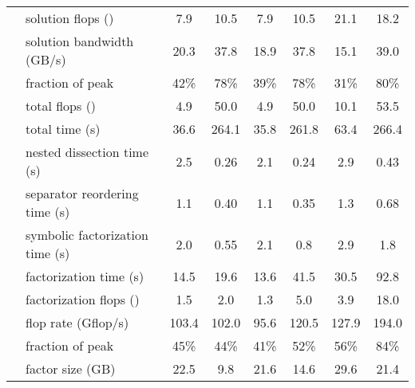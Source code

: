 \documentclass{article}
\begin{document}
\begin{table}[htp!]
\begin{center}
\begin{tabular}{|c|l||c|c|c|c|c|c|}
      &          solution flops () &  7.9    &  10.5  &  7.9  & 10.5  &  21.1  &  18.2  \\ 
      \hhline{|~-||-|-|-|-|-|-|}                                                         
      &                solution bandwidth (GB/s) &  20.3  &  37.8  & 18.9  & 37.8   &  15.1  & 39.0  \\ 
      &   \qquad fraction of peak                & 42\%   & 78\%   & 39\% & 78\%    & 31\%   & 80\% \\
      \hhline{|~-||-|-|-|-|-|-|}                                                               
      &          total flops () &  4.9     & 50.0   & 4.9    &  50.0  & 10.1 & 53.5 \\ 
      \hhline{|~-||-|-|-|-|-|-|}                                                               
      &                         total time (s) &  36.6   & 264.1  &  35.8   & 261.8  & 63.4 & 266.4 \\ 
      \hhline{==::=:=:=:=:=:=}
      \multirow{11}{*}{\rotatebox{90}{Multifrontal + HSS}}                                               
      &              nested dissection time (s) &   2.5   & 0.26    &  2.1   & 0.24  &  2.9  &  0.43 \\ 
      \hhline{|~-||-|-|-|-|-|-|}                                                               
      &            separator reordering time (s) &  1.1   &   0.40   &  1.1   & 0.35   &  1.3  &  0.68 \\ 
      \hhline{|~-||-|-|-|-|-|-|}                                                               
      &         symbolic factorization time (s) &   2.0   &  0.55    &  2.1   &  0.8  &  2.9   &  1.8 \\ 
      \hhline{|~-||-|-|-|-|-|-|}                                                               
      &                  factorization time (s) &  14.5   &  19.6   &  13.6  & 41.5  &  30.5  &  92.8 \\ 
      \hhline{|~-||-|-|-|-|-|-|}                                                               
      &    factorization flops () &  1.5   &  2.0    &  1.3   &  5.0   &  3.9  & 18.0  \\ 
      &   \qquad flop rate (Gflop/s) &  103.4 &  102.0  &  95.6  &  120.5 & 127.9 & 194.0 \\
      &   \qquad fraction of peak                &  45\%  &  44\%   &  41\%   & 52\%   &  56\% &  84\% \\
      \hhline{|~-||-|-|-|-|-|-|}                                                               
      &                        factor size (GB) &   22.5   &   9.8  &  21.6  & 14.6   &  29.6 & 21.4 \\ 

\end{tabular}
\end{center}
\end{table}
\end{document}
